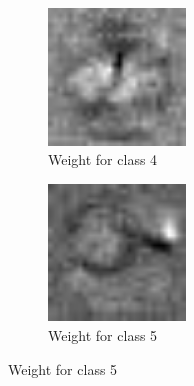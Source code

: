 \begin{figure}
    \begin{subfigure}
        \centering
        \includegraphics[width=0.4\textwidth]{figures/weights/class_4_weight_image.jpg}
        \caption{Weight for class 4}
        \label{fig:class_4_weight}
    \end{subfigure}
    \begin{subfigure}
        \centering
        \includegraphics[width=0.4\textwidth]{figures/weights/class_5_weight_image.jpg}
        \caption{Weight for class 5}
        \label{fig:class_5_weight}
    \end{subfigure}
    
    \newpage


\end{figure}
